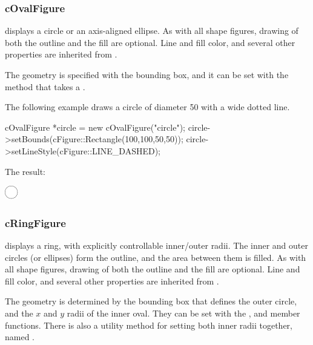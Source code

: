 \subsubsection{cOvalFigure}

 displays a circle or an axis-aligned ellipse. As with
all shape figures, drawing of both the outline and the fill are optional.
Line and fill color, and several other properties are inherited from
.

The geometry is specified with the bounding box, and it can be set with the
 method that takes a .

The following example draws a circle of diameter 50 with a wide dotted line.

\begin{cpp}
cOvalFigure *circle = new cOvalFigure("circle");
circle->setBounds(cFigure::Rectangle(100,100,50,50));
circle->setLineStyle(cFigure::LINE_DASHED);
\end{cpp}


The result:

\begin{center}
\includegraphics[scale=4.0]{figures/figure-oval}
\end{center}


\subsubsection{cRingFigure}

 displays a ring, with explicitly controllable
inner/outer radii. The inner and outer circles (or ellipses) form the
outline, and the area between them is filled. As with all shape figures,
drawing of both the outline and the fill are optional. Line and fill color,
and several other properties are inherited from
.

The geometry is determined by the bounding box that defines the outer
circle, and the $x$ and $y$ radii of the inner oval. They can be set with
the ,  and 
member functions. There is also a utility method for setting both
inner radii together, named .

